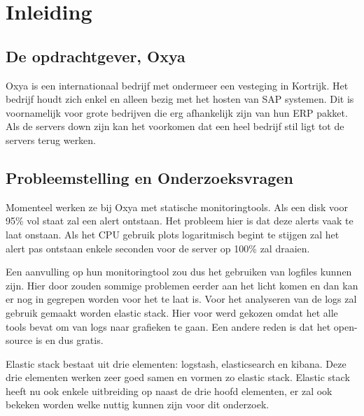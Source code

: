 
\chapter{Inleiding}
\label{ch:inleiding}


\textcite{Knuth1998}
\autocite{Creeger2009}

\section{De opdrachtgever, Oxya}
\label{sec:de-opdrachtgever}

Oxya is een internationaal bedrijf met ondermeer een vesteging in Kortrijk. Het bedrijf houdt zich enkel en alleen bezig met het hosten van SAP systemen. Dit is voornamelijk voor grote bedrijven die erg afhankelijk zijn van hun ERP pakket. Als de servers down zijn kan het voorkomen dat een heel bedrijf stil ligt tot de servers terug werken.

\section{Probleemstelling en Onderzoeksvragen}
\label{sec:onderzoeksvragen}

Momenteel werken ze bij Oxya met statische monitoringtools. Als een disk voor 95\% vol staat zal een alert ontstaan. Het probleem hier is dat deze alerts vaak te laat onstaan. Als het CPU gebruik plots logaritmisch begint te stijgen zal het alert pas ontstaan enkele seconden voor de server op 100\% zal draaien. 
 
Een aanvulling op hun monitoringtool zou dus het gebruiken van logfiles kunnen zijn. Hier door zouden sommige problemen eerder aan het licht komen en dan kan er nog in gegrepen worden voor het te laat is. Voor het analyseren van de logs zal gebruik gemaakt worden elastic stack. Hier voor werd gekozen omdat het alle tools bevat om van logs naar grafieken te gaan. Een andere reden is dat het open-source is en dus gratis. 

Elastic stack bestaat uit drie elementen: logstash, elasticsearch en kibana. Deze drie elementen werken zeer goed samen en vormen zo elastic stack. Elastic stack heeft nu ook enkele uitbreiding op naast de drie hoofd elementen, er zal ook bekeken worden welke nuttig kunnen zijn voor dit onderzoek.


